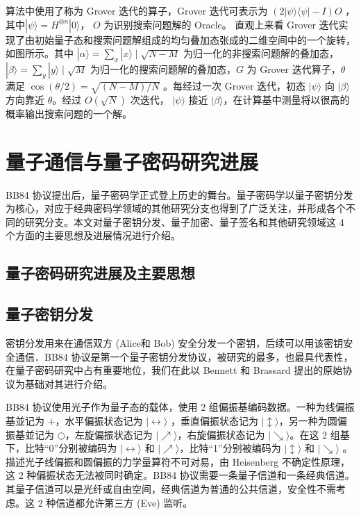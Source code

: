 算法中使用了称为 Grover 迭代的算子，Grover 迭代可表示为 $(2|\psi\rangle\langle\psi|-I) O$ ，其中$|\psi\rangle=H^{\otimes n}|0\rangle$， $O$ 为识别搜索问题解的 Oracle。 直观上来看 Grover 迭代实现了由初始量子态和搜索问题解组成的均匀叠加态张成的二维空间中的一个旋转，如图所示。其中 $|\alpha\rangle=\sum_{x}|x\rangle \mid \sqrt{N-M}$ 为归一化的非搜索问题解的叠加态，$|\beta\rangle=\sum_{y}|y\rangle \mid \sqrt{M}$ 为归一化的搜索问题解的叠加态，$G$ 为 Grover 迭代算子，$\theta$ 满足 $\cos (\theta / 2)=\sqrt{(N-M) / N}$ 。每经过一次 Grover 迭代，初态 $|\psi\rangle$ 向 $|\beta\rangle$ 方向靠近 $\theta$。经过 $O(\sqrt{N})$ 次迭代， $|\psi\rangle$ 接近 $|\beta\rangle$，在计算基中测量将以很高的概率输出搜索问题的一个解。

\section{量子通信与量子密码研究进展}

BB84 协议提出后，量子密码学正式登上历史的舞台。量子密码学以量子密钥分发为核心，对应于经典密码学领域的其他研究分支也得到了广泛关注，并形成各个不同的研究分支。本文对量子密钥分发、量子加密、量子签名和其他研究领域这 4 个方面的主要思想及进展情况进行介绍。

\subsection{量子密码研究进展及主要思想}

\subsection{量子密钥分发}

密钥分发用来在通信双方 (Alice和 Bob) 安全分发一个密钥，后续可以用该密钥安全通信．BB84 协议是第一个量子密钥分发协议，被研究的最多，也最具代表性，在量子密码研究中占有重要地位，我们在此以 Bennett 和 Brassard 提出的原始协议为基础对其进行介绍。

BB84 协议使用光子作为量子态的载体，使用 2 组偏振基编码数据。一种为线偏振基並记为 $+$，水平偏振状态记为 $|\leftrightarrow\rangle$ ，垂直偏振状态记为 $|\updownarrow\rangle$，另一种为圆偏振基並记为 $\bigcirc$，左旋偏振状态记为 $|\nearrow\rangle$，右旋偏振状态记为 $|\searrow\rangle$。在这 2 组基下，比特“0”分别被编码为 $|\leftrightarrow\rangle$ 和 $|\nearrow\rangle$，比特“1”分别被编码为 $|\updownarrow\rangle$ 和  $|\searrow\rangle$ 。描述光子线偏振和圆偏振的力学量算符不可对易，由 Heisenberg 不确定性原理，这 2 种偏振状态无法被同时确定。BB84 协议需要一条量子信道和一条经典信道。其量子信道可以是光纤或自由空间，经典信道为普通的公共信道，安全性不需考虑。这 2 种信道都允许第三方 (Eve) 监听。

